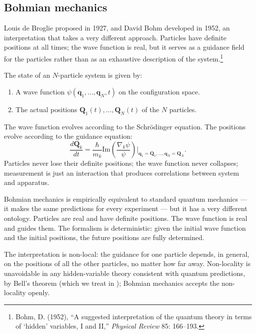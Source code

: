 \subsection{Bohmian mechanics}

Louis de Broglie proposed in 1927, and David Bohm developed in
1952, an interpretation that takes a very different approach.
Particles have definite positions at all times; the wave function is
real, but it serves as a guidance field for the particles rather
than as an exhaustive description of the system.\footnote{Bohm, D.
(1952), ``A suggested interpretation of the quantum theory in terms
of `hidden' variables, I and II,'' \emph{Physical Review} 85:
166--193.}

\begin{principlebox}
\label{prin:bohmian}
The state of an $N$-particle system is given by:
\begin{enumerate}[leftmargin=1.5em]
    \item A wave function $\psi(\mathbf{q}_1, \dots, \mathbf{q}_N, t)$
    on the configuration space.
    \item The actual positions $\mathbf{Q}_1(t), \dots, \mathbf{Q}_N(t)$
    of the $N$ particles.
\end{enumerate}
The wave function evolves according to the Schr\"odinger equation.
The positions evolve according to the guidance equation:
\[
    \frac{d\mathbf{Q}_k}{dt} = \frac{\hbar}{m_k}
    \text{Im}\left( \frac{\nabla_k \psi}{\psi}
    \right)\bigg|_{\mathbf{q}_1 = \mathbf{Q}_1, \dots, \mathbf{q}_N = \mathbf{Q}_N}.
\]
Particles never lose their definite positions; the wave function never
collapses; measurement is just an interaction that produces correlations
between system and apparatus.
\end{principlebox}

Bohmian mechanics is empirically equivalent to standard quantum
mechanics --- it makes the same predictions for every experiment ---
but it has a very different ontology. Particles are real and have
definite positions. The wave function is real and guides them. The
formalism is deterministic: given the initial wave function and the
initial positions, the future positions are fully determined.

The interpretation is non-local: the guidance for one particle
depends, in general, on the positions of all the other particles,
no matter how far away. Non-locality is unavoidable in any
hidden-variable theory consistent with quantum predictions, by
Bell's theorem (which we treat in ); Bohmian
mechanics accepts the non-locality openly.

